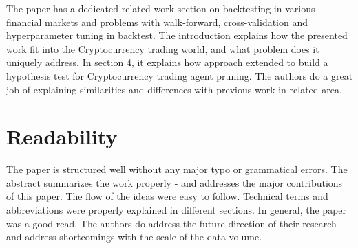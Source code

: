 \documentclass[twoside,11pt]{article}
\begin{document}
The paper has a dedicated related work section on backtesting in various financial markets and problems with walk-forward, cross-validation and hyperparameter tuning in backtest. The introduction explains how the presented work fit into the Cryptocurrency trading world, and what problem does it uniquely address. In section 4, it explains how \cite{bailey2016probability} approach extended to build a hypothesis test for Cryptocurrency trading agent pruning. The authors do a great job of explaining similarities and differences with previous work in related area.   

\section{Readability}

The paper is structured well without any major typo or grammatical errors. The abstract summarizes the work properly - and addresses the major contributions of this paper. The flow of the ideas were easy to follow. Technical terms and abbreviations were properly explained in different sections. In general, the paper was a good read. The authors do address the future direction of their research and address shortcomings with the scale of the data volume. 

\vskip 0.2in

\end{document}
